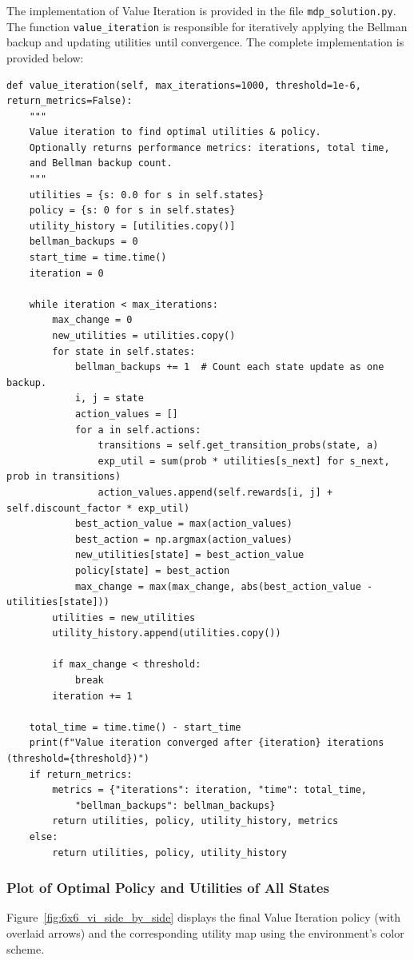 \documentclass[11pt]{article}
\begin{document}
\newpage
\noindent The implementation of Value Iteration is provided in the file \texttt{mdp\_solution.py}. The function \texttt{value\_iteration} is responsible for iteratively applying the Bellman backup and updating utilities until convergence. The complete implementation is provided below:

\begin{verbatim}
def value_iteration(self, max_iterations=1000, threshold=1e-6, return_metrics=False):
    """
    Value iteration to find optimal utilities & policy.
    Optionally returns performance metrics: iterations, total time, 
    and Bellman backup count.
    """
    utilities = {s: 0.0 for s in self.states}
    policy = {s: 0 for s in self.states}
    utility_history = [utilities.copy()]
    bellman_backups = 0
    start_time = time.time()
    iteration = 0

    while iteration < max_iterations:
        max_change = 0
        new_utilities = utilities.copy()
        for state in self.states:
            bellman_backups += 1  # Count each state update as one backup.
            i, j = state
            action_values = []
            for a in self.actions:
                transitions = self.get_transition_probs(state, a)
                exp_util = sum(prob * utilities[s_next] for s_next, prob in transitions)
                action_values.append(self.rewards[i, j] + self.discount_factor * exp_util)
            best_action_value = max(action_values)
            best_action = np.argmax(action_values)
            new_utilities[state] = best_action_value
            policy[state] = best_action
            max_change = max(max_change, abs(best_action_value - utilities[state]))
        utilities = new_utilities
        utility_history.append(utilities.copy())
        
        if max_change < threshold:
            break
        iteration += 1

    total_time = time.time() - start_time
    print(f"Value iteration converged after {iteration} iterations (threshold={threshold})")
    if return_metrics:
        metrics = {"iterations": iteration, "time": total_time, 
            "bellman_backups": bellman_backups}
        return utilities, policy, utility_history, metrics
    else:
        return utilities, policy, utility_history
\end{verbatim}

\subsubsection{Plot of Optimal Policy and Utilities of All States}
Figure~\ref{fig:6x6_vi_side_by_side} displays the final Value Iteration policy (with overlaid arrows) and the corresponding utility map using the environment's color scheme. 
\end{document}
